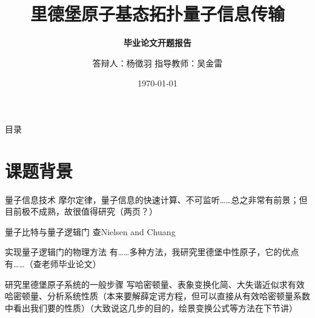\documentclass[10pt,aspectratio=43]{beamer}
\title{里德堡原子基态拓扑量子信息传输}
\subtitle{\fontsize{9pt}{14pt}\textbf{毕业论文开题报告}}
\author{答辩人：杨徵羽 \quad 指导教师：吴金雷}
\institute{哈尔滨工业大学(威海)理学院}
\date{\today}
\begin{document}
\frame{\titlepage}

\section[目录]{}   %
\begin{frame}{目录}
\tableofcontents
\end{frame}

\section{课题背景}
\begin{frame}{量子信息技术}
摩尔定律，量子信息的快速计算、不可监听……总之非常有前景；但目前极不成熟，故很值得研究（两页？）
\end{frame}
\begin{frame}{量子比特与量子逻辑门}
查Nielsen and Chuang
\end{frame}
\begin{frame}{实现量子逻辑门的物理方法}
有……多种方法，我研究里德堡中性原子，它的优点有……（查老师毕业论文）
\end{frame}
\begin{frame}{研究里德堡原子系统的一般步骤}
写哈密顿量、表象变换化简、大失谐近似求有效哈密顿量、分析系统性质（本来要解薛定谔方程，但可以直接从有效哈密顿量系数中看出我们要的性质）（大致说这几步的目的，绘景变换公式等方法在下节讲）
\end{frame}
\end{document}
